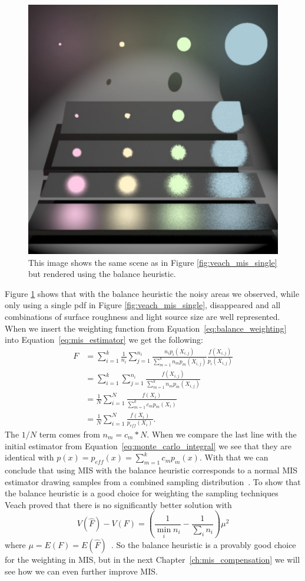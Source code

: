 \begin{figure}[h]
    \centering
    \includegraphics[width=.4\textwidth]{images/veach_mis_both.png}
    \caption{This image shows the same scene as in Figure \ref{fig:veach_mis_single} but rendered using the balance heuristic.
    \cite[Figure~9.4]{veach-thesis}}
    \label{fig:veach_mis_balance}
\end{figure}

Figure \ref{fig:veach_mis_balance} shows that with the balance heuristic the noisy areas we observed,
while only using a single pdf in Figure \ref{fig:veach_mis_single}, disappeared
and all combinations of surface roughness and light source size are well represented.\\
When we insert the weighting function from Equation~\ref{eq:balance_weighting} into Equation~\ref{eq:mis_estimator}
we get the following:
\begin{equation*}
\begin{aligned}
    F &= \sum_{i = 1}^k \frac{1}{n_i} \sum_{j = 1}^{n_i} \frac{n_i p_i(X_{i,j})}{\sum_{m = 1}^k n_m p_m(X_{i,j})} \frac{f(X_{i,j})}{p_i(X_{i,j})}\\
    &= \sum_{i = 1}^k \sum_{j = 1}^{n_i} \frac{f(X_{i,j})}{\sum_{m = 1}^k n_m p_m(X_{i,j})}\\
    &= \frac{1}{N} \sum_{i = 1}^N \frac{f(X_{i})}{\sum_{m = 1}^k c_m p_m(X_{i})}\\
    &=\frac{1}{N} \sum_{i = 1}^N \frac{f(X_{i})}{p_{eff}(X_i)}.
\end{aligned}
\end{equation*}
The $ 1 / N $ term comes from $ n_m = c_m * N $.
When we compare the last line with the initial estimator from Equation~\ref{eq:monte_carlo_integral}
we see that they are identical with $ p(x) = p_{eff}(x) = \sum_{m = 1}^k c_m p_m(x) $.
With that we can conclude that using MIS with the balance heuristic
corresponds to a normal MIS estimator drawing samples from a combined sampling distribution~\cite[Chapter~9.2.2.1]{veach-thesis}.
To show that the balance heuristic is a good choice for weighting the sampling techniques Veach proved that there is no significantly better solution with
$$ V(\hat{F}) - V(F) = (\frac{1}{\min_i n_i} - \frac{1}{\sum_i n_i}) \mu^2 $$
where $ \mu = E(F) = E(\hat{F}) $~\cite[Theorem~9.2]{veach-thesis}.
So the balance heuristic is a provably good choice for the weighting in MIS,
but in the next Chapter~\ref{ch:mis_compensation} we will see how we can even further improve MIS.